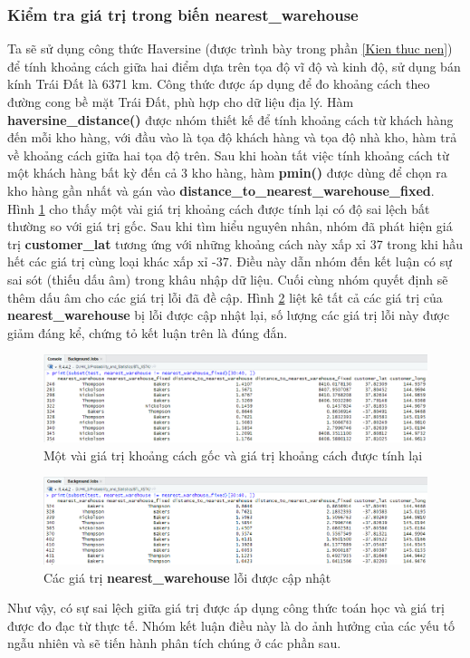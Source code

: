 \subsubsection{Kiểm tra giá trị trong biến nearest\_warehouse}
Ta sẽ sử dụng công thức Haversine (được trình bày trong phần \ref{Kien thuc nen}) để tính khoảng cách giữa hai điểm dựa trên tọa độ vĩ độ và kinh độ, sử dụng bán kính Trái Đất là 6371 km. Công thức được áp dụng để đo khoảng cách theo đường cong bề mặt Trái Đất, phù hợp cho dữ liệu địa lý. Hàm \textbf{haversine\_distance()} được nhóm thiết kế để tính khoảng cách từ khách hàng đến mỗi kho hàng, với đầu vào là tọa độ khách hàng và tọa độ nhà kho, hàm trả về khoảng cách giữa hai tọa độ trên. Sau khi hoàn tất việc tính khoảng cách từ một khách hàng bất kỳ đến cả 3 kho hàng, hàm \textbf{pmin()} được dùng để chọn ra kho hàng gần nhất và gán vào \textbf{distance\_to\_nearest\_warehouse\_fixed}. Hình \ref{f6} cho thấy một vài giá trị khoảng cách được tính lại có độ sai lệch bất thường so với giá trị gốc. Sau khi tìm hiểu nguyên nhân, nhóm đã phát hiện giá trị \textbf{customer\_lat} tương ứng với những khoảng cách này xấp xỉ 37 trong khi hầu hết các giá trị cùng loại khác xấp xỉ -37. Điều này dẫn nhóm đến kết luận có sự sai sót (thiếu dấu âm) trong khâu nhập dữ liệu. Cuối cùng nhóm quyết định sẽ thêm dấu âm cho các giá trị lỗi đã đề cập. Hình \ref{f7} liệt kê tất cả các giá trị của \textbf{nearest\_warehouse} bị lỗi được cập nhật lại, số lượng các giá trị lỗi này được giảm đáng kể, chứng tỏ kết luận trên là đúng đắn.
\begin{figure}[!htbp]
    \centering
    \includegraphics[width=\textwidth]{graphics/Pre_processing_data/f6.PNG}
    \caption{Một vài giá trị khoảng cách gốc và giá trị khoảng cách được tính lại}
    \label{f6}
\end{figure}
\begin{figure}[!htbp]
    \centering
    \includegraphics[width=\textwidth]{graphics/Pre_processing_data/f7.PNG}
    \caption{Các giá trị \textbf{nearest\_warehouse} lỗi được cập nhật}
    \label{f7}
\end{figure}

Như vậy, có sự sai lệch giữa giá trị được áp dụng công thức toán học và giá trị được đo đạc từ thực tế. Nhóm kết luận điều này là do ảnh hưởng của các yếu tố ngẫu nhiên và sẽ tiến hành phân tích chúng ở các phần sau.